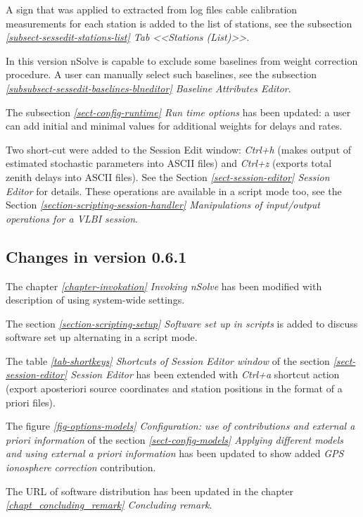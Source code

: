 \documentclass [10pt,letterpaper]{report}
\newcommand{\nuSolve}{\greektext n\latintext Solve}
\begin{document}
{A sign that was applied to extracted from log files cable calibration
measurements for each station is added to the list of stations, see the
subsection \emph{\ref{subsect-sessedit-stations-list} Tab <<Stations (List)>>}.

In this version \nuSolve{} is capable to exclude some baselines from weight correction
procedure. A user can manually select such baselines, see the subsection
\emph{\ref{subsubsect-sessedit-baselines-blneditor} Baseline Attributes Editor}.

The subsection \emph{\ref{sect-config-runtime} Run time options} has been updated:
a user can add initial and minimal values for additional weights for delays and rates.

Two short-cut were added to the Session Edit window: {\sl Ctrl+h} (makes output of
estimated stochastic parameters into ASCII files) and {\sl Ctrl+z} (exports total
zenith delays into ASCII files). See the Section \emph{\ref{sect-session-editor}
Session Editor} for details. These operations are available in a script mode
too, see the Section
\emph{\ref{section-scripting-session-handler} Manipulations of input/output operations for a VLBI session}.



\subsection{Changes in version 0.6.1}
The chapter
\emph{\ref{chapter-invokation} Invoking \nuSolve{}}
has been modified with description of using system-wide settings.

The section
\emph{\ref{section-scripting-setup} Software set up in scripts}
is added to discuss software set up alternating in a script mode.

The table
\emph{\ref{tab-shortkeys} Shortcuts of Session Editor window} of the section
\emph{\ref{sect-session-editor} Session Editor} has been extended with {\sl Ctrl+a}
shortcut action (export aposteriori source coordinates and station positions in the
format of a priori files).

The figure
\emph{\ref{fig-options-models} Configuration: use of contributions and external {\it a priori} information}
of the section
\emph{\ref{sect-config-models} Applying different models and using external a priori information}
has been updated to show added {\sl GPS ionosphere correction} contribution.

The URL of software distribution has been updated in the chapter
\emph{\ref{chapt_concluding_remark} Concluding remark}.



}
\end{document}
